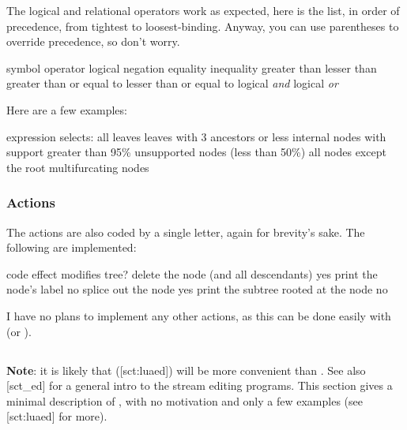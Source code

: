 The logical and relational operators work as expected, here is the list, in
order of precedence, from tightest to loosest-binding.  Anyway, you can use
parentheses to override precedence, so don't worry.

\startalignment[center]
	\starttabulate[|c|l|]
		\NC symbol 		\NC operator \NC\NR
		\HL
		\NC \code{!} 	\NC logical negation \NC\NR
		\HL
		\NC \code{==}	\NC equality \NC\NR
		\NC \code{!=} \NC inequality \NC\NR
		\NC \code{<} 	\NC greater than \NC\NR
		\NC \code{>} 	\NC lesser than \NC\NR
		\NC \code{>=} \NC greater than or equal to \NC\NR
		\NC \code{<=} \NC lesser than or equal to \NC\NR
		\HL
		\NC \code{\&} \NC logical {\em and} \NC\NR
		\HL
		\NC \code{\|} 	\NC logical {\em or} \NC\NR
	\stoptabulate
\stopalignment

Here are a few examples:

\startalignment[center]
	\starttabulate[|c|l|]
		\NC expression \NC selects: \NC\NR
		\HL
		\NC {} \NC all leaves \NC\NR
		\NC {} \NC leaves with 3 ancestors or less \NC\NR
		\NC {} \NC internal nodes with support greater than 95\% \NC\NR 
		\NC {} \NC unsupported nodes (less than 50\%) \NC\NR
		\NC {} \NC all nodes except the root \NC\NR
		\NC {} \NC multifurcating nodes \NC\NR
	\stoptabulate
\stopalignment

\subsubsection{Actions}

The actions are also coded by a single letter, again for brevity's sake. The
following are implemented:

\startalignment[center]
	\starttabulate[|c|l|c|]
		\NC code \NC effect \NC modifies tree?\NC\NR
		\HL
		\NC {} \NC delete the node (and all descendants) \NC yes \NC\NR
		\NC {} \NC print the node's label \NC no \NC\NR
		\NC {} \NC splice out the node \NC yes \NC\NR
		\NC {} \NC print the subtree rooted at the node \NC no \NC\NR
	\stoptabulate
\stopalignment

I have no plans to implement any other actions, as this can be done easily
with \luaed{} (or \sched).

\subsection{\sched}

{\bf Note}: it is likely that \luaed{} (\in{}[sct:luaed]) will be more
convenient than \sched. See also [sct_ed] for a general intro to the
stream editing programs. This section gives a minimal description of \sched,
with no motivation and only a few examples (see \in{}[sct:luaed] for more).

